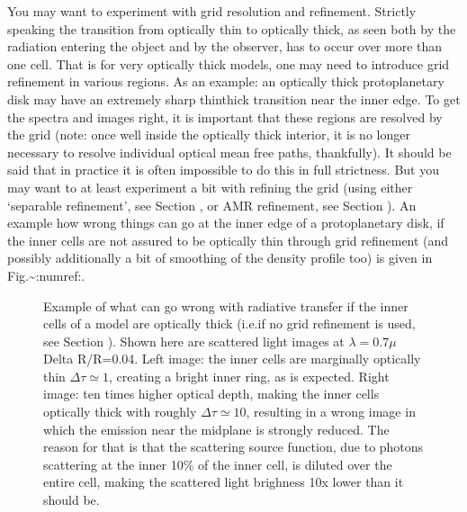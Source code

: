 \documentclass[letterpaper,10pt,english]{sphinxmanual}
\begin{document}
\begin{enumerate}
You may want to experiment with grid resolution and refinement. Strictly
speaking the transition from optically thin to optically thick, as seen both
by the radiation entering the object and by the observer, has to occur over
more than one cell. That is for very optically thick models, one may need to
introduce grid refinement in various regions. As an example: an optically
thick protoplanetary disk may have an extremely sharp thin\sphinxhyphen{}thick transition
near the inner edge. To get the spectra and images right, it is important
that these regions are resolved by the grid (note: once well inside the
optically thick interior, it is no longer necessary to resolve individual
optical mean free paths, thankfully). It should be said that in practice it
is often impossible to do this in full strictness. But you may want to at
least experiment a bit with refining the grid (using either ‘separable
refinement’, see Section {\hyperref[\detokenize{gridding:sec-separable-refinement}]{}}, or AMR refinement,
see Section {\hyperref[\detokenize{inputoutputfiles:sec-amr-grid-oct-tree}]{}}). An example how wrong things can go
at the inner edge of a protoplanetary disk, if the inner cells are not
assured to be optically thin through grid refinement (and possibly
additionally a bit of smoothing of the density profile too) is given in
Fig.\textasciitilde{}:numref:.

\begin{figure}[htbp]
\centering
\capstart

\noindent{}
\caption{Example of what can go wrong with radiative transfer if the inner cells of
a model are optically thick (i.e.if no grid refinement is used, see
Section {\hyperref[\detokenize{gridding:sec-separable-refinement}]{}}). Shown here are scattered light
images at \(\lambda=0.7\mu\)Delta R/R=0.04\textasciigrave{}.  Left image: the
inner cells are marginally optically thin \(\Delta\tau\simeq 1\),
creating a bright inner ring, as is expected. Right image: ten times
higher optical depth, making the inner cells optically thick with roughly
\(\Delta\tau\simeq 10\), resulting in a wrong image in which the
emission near the midplane is strongly reduced.  The reason for that is
that the scattering source function, due to photons scattering at the
inner 10\% of the inner cell, is diluted over the entire cell, making the
scattered light brighness 10x lower than it should be.}\label{\detokenize{tipsandtricks:id1}}\label{\detokenize{tipsandtricks:fig-innerrim-lowres}}\end{figure}


\end{enumerate}
\end{document}

